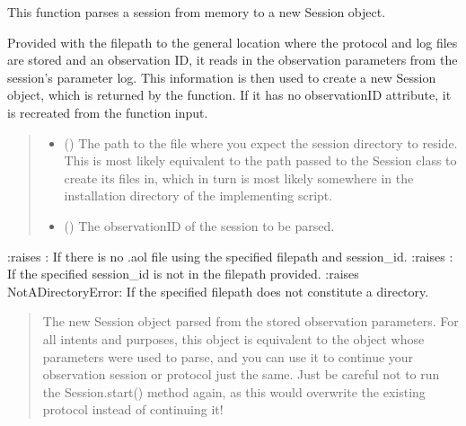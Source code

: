 \documentclass[letterpaper,10pt,english]{sphinxmanual}
\begin{document}
\begin{fulllineitems}
\label{\detokenize{autoapi/aop/aop/index:aop.aop.parse_session}}
\pysigstartsignatures
{}
\pysigstopsignatures
\sphinxAtStartPar
This function parses a session from memory to a new Session object.

\sphinxAtStartPar
Provided with the filepath to the general location where the protocol and
log files are stored and an observation ID, it reads in the observation
parameters from the session’s parameter log. This information is then used
to create a new Session object, which is returned by the function. If it
has no observationID attribute, it is recreated from the function input.
\begin{quote}\begin{description}
\begin{itemize}
\item {} 
\sphinxAtStartPar
{} () \textendash{} The path to the file where you expect the session directory to reside.
This is most likely equivalent to the path passed to the Session class
to create its files in, which in turn is most likely somewhere in the
installation directory of the implementing script.

\item {} 
\sphinxAtStartPar
{} () \textendash{} The observationID of the session to be parsed.

\end{itemize}

\end{description}\end{quote}

\sphinxAtStartPar
:raises : If there is no .aol file using the specified filepath and session\_id.
:raises : If the specified session\_id is not in the filepath provided.
:raises NotADirectoryError: If the specified filepath does not constitute a directory.
\begin{quote}\begin{description}
\sphinxAtStartPar
The new Session object parsed from the stored observation parameters.
For all intents and purposes, this object is equivalent to the object
whose parameters were used to parse, and you can use it to continue your
observation session or protocol just the same. Just be careful not to
run the Session.start() method again, as this would overwrite the
existing protocol instead of continuing it!


\end{description}
\end{quote}
\end{fulllineitems}
\end{document}
